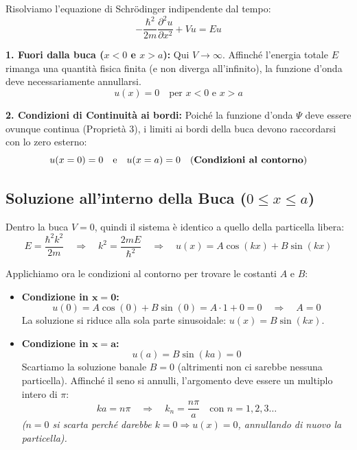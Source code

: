 \documentclass[11pt, a4paper]{article}
\begin{document}
Risolviamo l'equazione di Schrödinger indipendente dal tempo: %
\begin{equation*}
    -\frac{\hbar^2}{2m} \frac{\partial^2 u}{\partial x^2} + V u = E u %
\end{equation*}

\noindent
\textbf{1. Fuori dalla buca ($x < 0$ e $x > a$):} %
Qui $V \to \infty$. Affinché l'energia totale $E$ rimanga una quantità fisica finita (e non diverga all'infinito), la funzione d'onda deve necessariamente annullarsi. %
\begin{equation*}
    u(x) = 0 \quad \text{per } x < 0 \text{ e } x > a %
\end{equation*}

\noindent
\textbf{2. Condizioni di Continuità ai bordi:} %
Poiché la funzione d'onda $\Psi$ deve essere ovunque continua (Proprietà 3), i limiti ai bordi della buca devono raccordarsi con lo zero esterno: %
\begin{equation}
    u(x=0) = 0 \quad \text{e} \quad u(x=a) = 0 \quad \text{(\textbf{Condizioni al contorno})} %
\end{equation}

\subsection{Soluzione all'interno della Buca ($0 \le x \le a$)} %

Dentro la buca $V=0$, quindi il sistema è identico a quello della particella libera: %
\begin{equation*}
    E = \frac{\hbar^2 k^2}{2m} \quad \Rightarrow \quad k^2 = \frac{2mE}{\hbar^2} \quad \Rightarrow \quad u(x) = A\cos(kx) + B\sin(kx) %
\end{equation*}

Applichiamo ora le condizioni al contorno per trovare le costanti $A$ e $B$: %
\begin{itemize}
    \item \textbf{Condizione in $\mathbf{x=0}$:} %
    \begin{equation*}
        u(0) = A\cos(0) + B\sin(0) = A \cdot 1 + 0 = 0 \quad \Rightarrow \quad \boxed{ A = 0 } %
    \end{equation*}
    La soluzione si riduce alla sola parte sinusoidale: $u(x) = B\sin(kx)$. %

    \item \textbf{Condizione in $\mathbf{x=a}$:} %
    \begin{equation*}
        u(a) = B\sin(ka) = 0 %
    \end{equation*}
    Scartiamo la soluzione banale $B=0$ (altrimenti non ci sarebbe nessuna particella). Affinché il seno si annulli, l'argomento deve essere un multiplo intero di $\pi$: %
    \begin{equation}
        ka = n\pi \quad \Rightarrow \quad \boxed{ k_n = \frac{n\pi}{a} } \quad \text{con } n = 1, 2, 3 \dots %
    \end{equation}
    \textit{($n=0$ si scarta perché darebbe $k=0 \Rightarrow u(x)=0$, annullando di nuovo la particella).}
\end{itemize}
\end{document}
